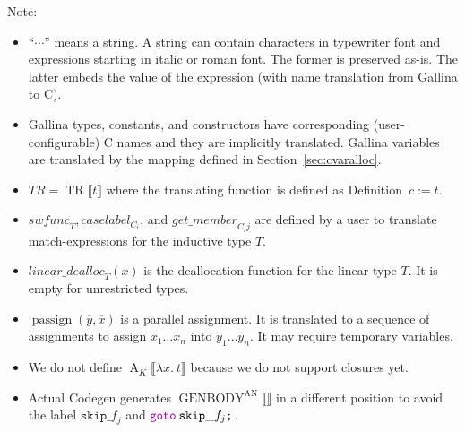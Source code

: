 \documentclass[a4paper,fleqn]{article}
\def\gallina{\textrm{Gallina}}
\def\codegen{\textrm{Codegen}}
\newcommand{\kwDefinition}{\mbox{\color{myviolet}\ttfamily Definition}}
\newcommand{\kwmatch}{\mbox{\color{mygreen}\ttfamily match}}
\newcommand{\lam}[2]{\lambda #1.\:#2}
\newcommand{\BRA}[1]{\llbracket #1 \rrbracket}
\DeclareMathOperator{\genbody}{GENBODY}
\newcommand{\genbodyan}[1]{\genbody^\mathrm{AN}\BRA{#1}}
\DeclareMathOperator{\TRop}{TR}
\newcommand{\TR}[1]{\TRop\BRA{#1}}
\newcommand{\tr}{\mathit{TR}}
\newcommand{\dq}[1]{\text{``}#1\text{''}}
\newcommand{\ttsemi}{\texttt{;}}
\newcommand{\kwgoto}{\mbox{\color{myviolet}\ttfamily goto}}
\newcommand{\secref}[1]{Section~\ref{#1}}
\DeclareMathOperator{\passign}{passign}
\DeclareMathOperator{\Aop}{A}
\newcommand{\A}[2]{\Aop_{#1}\BRA{#2}}
\newcommand{\rep}[1]{\overline{#1}}
\begin{document}
{\small Note:
\begin{itemize}
  \item $\dq{\cdots}$ means a string.
    A string can contain characters in typewriter font and expressions starting in italic or roman font.
    The former is preserved as-is.
    The latter embeds the value of the expression (with name translation from \gallina{} to C).
  \item \gallina{} types, constants, and constructors have corresponding (user-configurable) C names and they are implicitly translated.
    \gallina{} variables are translated by the mapping defined in \secref{sec:cvaralloc}.
  \item $\tr = \TR{t}$ where the translating function is defined as \kwDefinition~$c := t$.
  \item $\mathit{swfunc}_T, \mathit{caselabel}_{C_i}$, and $\mathit{get\_member}_{C_i j}$ are defined by a user to translate \kwmatch-expressions for the inductive type $T$.
  \item $\mathit{linear\_dealloc}_{T}(x)$ is the deallocation function for the linear type $T$.  It is empty for unrestricted types.
  \item $\passign(\rep{y}, \rep{x})$ is a parallel assignment. It is translated to a sequence of assignments to assign $x_1\ldots x_n$ into $y_1\ldots y_n$.  It may require temporary variables.
  \item We do not define $\A{K}{\lam{x}{t}}$ because we do not support closures yet.
  \item Actual \codegen{} generates $\genbodyan{}$ in a different position to avoid the label $\mathtt{skip\_}f_j$ and $\kwgoto\:\mathtt{skip\_}f_j\ttsemi$.
\end{itemize}}
\end{document}
